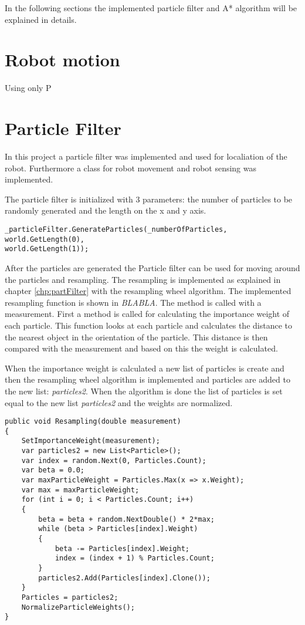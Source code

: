 
In the following sections the implemented particle filter and A* algorithm will be explained in details.

\section{Robot motion}
Using only P

\section{Particle Filter}
In this project a particle filter was implemented and used for localiation of the robot. Furthermore a class for robot movement and robot sensing was implemented. 

The particle filter is initialized with 3 parameters: the number of particles to be randomly generated and the length on the x and y axis.

\lstset{style=sharpc}
\begin{lstlisting}[caption={Initialization of the particle filter}, label=lst:wheel, mathescape=true]             
_particleFilter.GenerateParticles(_numberOfParticles, world.GetLength(0),
world.GetLength(1));
\end{lstlisting}

After the particles are generated the Particle filter can be used for moving around the particles and resampling. The resampling is implemented as explained in chapter \ref{chp:partFilter} with the resampling wheel algorithm. The implemented resampling function is shown in \emph{BLABLA}. The method is called with a measurement. First a method is called for calculating the importance weight of each particle. This function looks at each particle and calculates the distance to the nearest object in the orientation of the particle. This distance is then compared with the measurement and based on this the weight is calculated.

When the importance weight is calculated a new list of particles is create and then the resampling wheel algorithm is implemented and particles are added to the new list: \emph{particles2}. When the algorithm is done the list of particles is set equal to the new list \emph{particles2} and the weights are normalized.

\lstset{style=sharpc}
\begin{lstlisting}[caption={Resampling wheel}, label=lst:wheel, mathescape=true]                          
public void Resampling(double measurement)
{
	SetImportanceWeight(measurement);
	var particles2 = new List<Particle>();
	var index = random.Next(0, Particles.Count);
	var beta = 0.0;
	var maxParticleWeight = Particles.Max(x => x.Weight);
	var max = maxParticleWeight;
	for (int i = 0; i < Particles.Count; i++)
	{
		beta = beta + random.NextDouble() * 2*max;
		while (beta > Particles[index].Weight)
		{
			beta -= Particles[index].Weight;
			index = (index + 1) % Particles.Count;
		}
		particles2.Add(Particles[index].Clone());
	}
	Particles = particles2;
	NormalizeParticleWeights();
}
\end{lstlisting}

